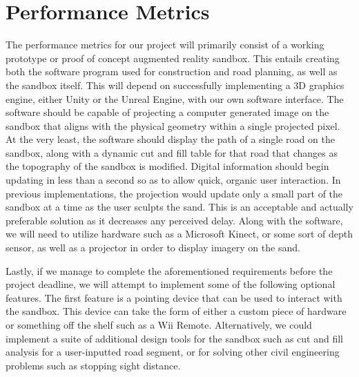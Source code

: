 \documentclass[onecolumn, draftclsnofoot,10pt, compsoc]{IEEEtran}
\begin{document}
\section{Performance Metrics}
The performance metrics for our project will primarily consist of a working prototype or proof of concept augmented reality sandbox.
This entails creating both the software program used for construction and road planning, as well as the sandbox itself.
This will depend on successfully implementing a 3D graphics engine, either Unity or the Unreal Engine, with our own software interface.
The software should be capable of projecting a computer generated image on the sandbox that aligns with the physical geometry within a single projected pixel.
At the very least, the software should display the path of a single road on the sandbox, along with a dynamic cut and fill table for that road that changes as the topography of the sandbox is modified.
Digital information should begin updating in less than a second so as to allow quick, organic user interaction.
In previous implementations, the projection would update only a small part of the sandbox at a time as the user sculpts the sand. 
This is an acceptable and actually preferable solution as it decreases any perceived delay.
Along with the software, we will need to utilize hardware such as a Microsoft Kinect, or some sort of depth sensor, as well as a projector in order to display imagery on the sand.
\par
Lastly, if we manage to complete the aforementioned requirements before the project deadline, we will attempt to implement some of the following optional features.
The first feature is a pointing device that can be used to interact with the sandbox.
This device can take the form of either a custom piece of hardware or something off the shelf such as a Wii Remote.
Alternatively, we could implement a suite of additional design tools for the sandbox such as cut and fill analysis for a user-inputted road segment, or for solving other civil engineering problems such as stopping sight distance.
\end{document}
